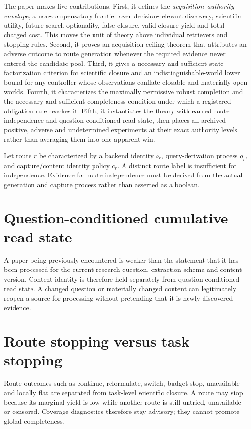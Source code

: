 \documentclass[11pt]{article}
\theoremstyle{definition}
\begin{document}
The paper makes five contributions.  First, it defines the
\emph{acquisition--authority envelope}, a non-compensatory frontier over
decision-relevant discovery, scientific utility, future-search optionality,
false closure, valid closure yield and total charged cost.  This moves the unit
of theory above individual retrievers and stopping rules.  Second, it proves an
acquisition-ceiling theorem that attributes an adverse outcome to route
generation whenever the required evidence never entered the candidate pool.
Third, it gives a necessary-and-sufficient state-factorization criterion for
scientific closure and an indistinguishable-world lower bound for any controller
whose observations conflate closable and materially open worlds.  Fourth, it
characterizes the maximally permissive robust completion and the
necessary-and-sufficient completeness condition under which a registered
obligation rule reaches it.  Fifth, it instantiates the theory
with earned route independence and question-conditioned read state, then places
all archived positive, adverse and undetermined experiments at their exact
authority levels rather than averaging them into one apparent win.

Let route $r$ be characterized by a backend identity $b_r$, query-derivation process $q_r$, and capture/content identity policy $c_r$. A distinct route label is insufficient for independence. Evidence for route independence must be derived from the actual generation and capture process rather than asserted as a boolean.

\section{Question-conditioned cumulative read state}
A paper being previously encountered is weaker than the statement that it has been processed for the current research question, extraction schema and content version. Content identity is therefore held separately from question-conditioned read state. A changed question or materially changed content can legitimately reopen a source for processing without pretending that it is newly discovered evidence.

\section{Route stopping versus task stopping}
Route outcomes such as continue, reformulate, switch, budget-stop, unavailable and locally flat are separated from task-level scientific closure. A route may stop because its marginal yield is low while another route is still untried, unavailable or censored. Coverage diagnostics therefore stay advisory; they cannot promote global completeness.
\end{document}
